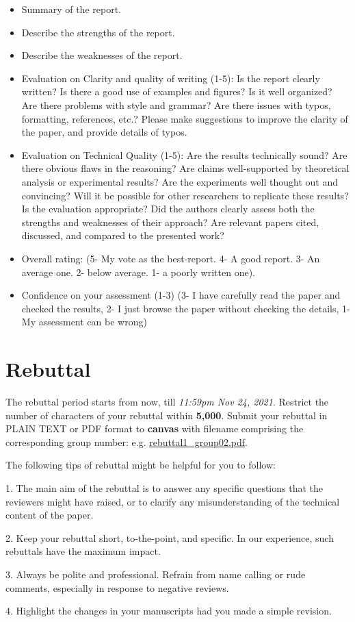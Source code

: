 \documentclass[11pt]{article}
\begin{document}
\begin{itemize}
\item Summary of the report.
\item Describe the strengths of the report. 
\item Describe the weaknesses of the report.
\item Evaluation on Clarity and quality of writing (1-5): Is the report clearly written? Is there a good use of examples and figures? Is it well organized? Are there problems with style and grammar? Are there issues with typos, formatting, references, etc.? Please make suggestions to improve the clarity of the paper, and provide details of typos.
\item Evaluation on Technical Quality (1-5): Are the results technically sound? Are there obvious flaws in the reasoning? Are claims well-supported by theoretical analysis or experimental results? Are the experiments well thought out and convincing? Will it be possible for other researchers to replicate these results? Is the evaluation appropriate? Did the authors clearly assess both the strengths and weaknesses of their approach? Are relevant papers cited, discussed, and compared to the presented work?
\item Overall rating: (5- My vote as the best-report. 4- A good report. 3- An average one. 2- below average. 1- a poorly written one). 
\item Confidence on your assessment (1-3)
(3- I have carefully read the paper and checked the results, 2- I just browse the paper without checking the details, 1- My assessment can be wrong)
\end{itemize}
%
%
\newpage

\section*{Rebuttal}
The rebuttal period starts from now, till \emph{11:59pm Nov 24, 2021}. Restrict the number of characters of your rebuttal within {\bf{5,000}}. Submit your rebuttal in PLAIN TEXT or PDF format to \textbf{canvas} with filename comprising the corresponding group number: e.g. \underline{rebuttal1\_group02.pdf}. %

The following tips of rebuttal might be helpful for you to follow:

1. The main aim of the rebuttal is to answer any specific questions that the reviewers might have raised, or to clarify any misunderstanding of the technical content of the paper.

2. Keep your rebuttal short, to-the-point, and specific. In our experience, such rebuttals have the maximum impact.

3. Always be polite and professional. Refrain from name calling or rude comments, especially in response to negative reviews.

4. Highlight the changes in your manuscripts had you made a simple revision.

%
\end{document}
